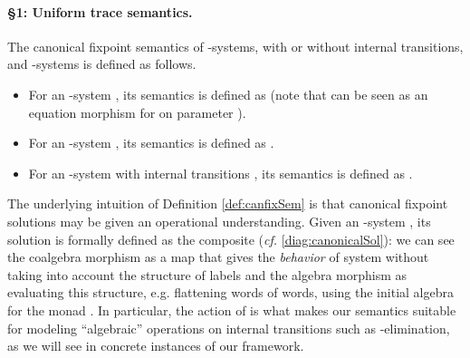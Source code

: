 \documentclass[oribibl,envcountsame,envcountsect,runningheads]{llncs}
\renewcommand{\>}{\rangle}
\begin{document}
\paragraph{\bf \S 1: Uniform trace semantics.}  The canonical fixpoint semantics of -systems, with or without internal transitions, and -systems is defined as follows.
 \begin{definition} \label{def:canfixSem}
\begin{itemize}
  \item For an -system , its semantics  is defined as 
(note that  can be seen as  an equation morphism for  on parameter ).
\item For an -system , its semantics  is defined as .
\item For an -system with internal transitions , its semantics  is defined as .
\end{itemize}
\end{definition}
The underlying intuition of Definition \ref{def:canfixSem} is that canonical fixpoint solutions may be given an operational understanding. Given an -system , its solution  is formally defined as the composite  (\emph{cf.} \eqref{diag:canonicalSol}): we can see the coalgebra morphism  as a map that gives the \emph{behavior} of system  without taking into account the structure of labels and the algebra morphism 
as evaluating this structure, e.g. flattening words of words, using the initial algebra  for the monad . In particular, the action of  is what makes our semantics suitable for modeling ``algebraic'' operations on internal transitions such as -elimination, as we will see in concrete instances of our framework.
\end{document}
